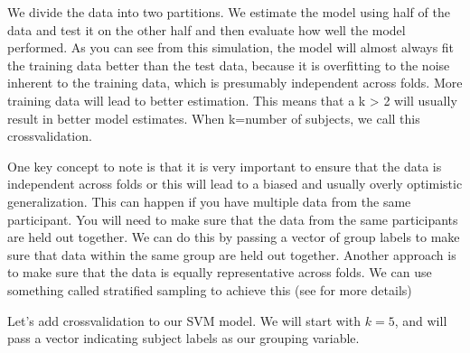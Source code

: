 \documentclass[letterpaper,10pt,english]{sphinxmanual}
\begin{document}

We divide the data into two partitions. We estimate the model using half of the data and test it on the other half and then evaluate how well the model performed. As you can see from this simulation, the model will almost always fit the training data better than the test data, because it is overfitting to the noise inherent to the training data, which is presumably independent across folds. More training data will lead to better estimation. This means that a k \textgreater{} 2 will usually result in better model estimates. When k=number of subjects, we call this  cross\sphinxhyphen{}validation.

One key concept to note is that it is very important to ensure that the data is independent across folds or this will lead to a biased and usually overly optimistic generalization. This can happen if you have multiple data from the same participant. You will need to make sure that the data from the same participants are held out together. We can do this by passing a vector of group labels to make sure that data within the same group are held out together. Another approach is to make sure that the data is equally representative across folds. We can use something called stratified sampling to achieve this (see  for more details)

Let’s add cross\sphinxhyphen{}validation to our SVM model.  We will start with \(k=5\), and will pass a vector indicating subject labels as our grouping variable.
\end{document}
